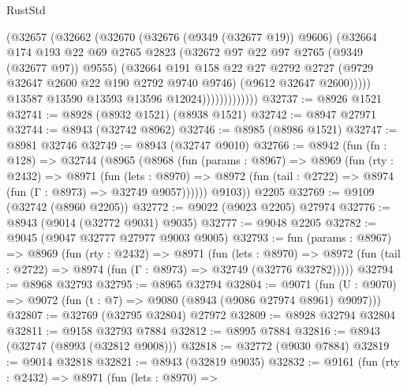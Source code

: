 \begin{lexlean}{RustStd}
\begin{coremodule}
                            (@32657
                              (@32662
                                (@32670
                                  (@32676 (@9349 (@32677 @19)) @9606)
                                  (@32664
                                    @174
                                    @193
                                    @22
                                    @69
                                    @2765
                                    @2823
                                    (@32672 @97 @22 @97 @2765 (@9349 (@32677 @97)) @9555)
                                    (@32664
                                      @191
                                      @158
                                      @22
                                      @27
                                      @2792
                                      @2727
                                      (@9729 @32647 @2600 @22 @190 @2792 @9740 @9746)
                                      (@9612 @32647 @2600)))))
                              @13587
                              @13590
                              @13593
                              @13596
                              @12024)))))))))))))
@32737 := @8926 @1521
@32741 := @8928 (@8932 @1521) (@8938 @1521)
@32742 := @8947 @27971
@32744 := @8943 (@32742 @8962)
@32746 := @8985 (@8986 @1521)
@32747 := @8981 @32746
@32749 := @8943 (@32747 @9010)
@32766 := @8942
    (fun (fn : @128) =>
    @32744
      (@8965
        (@8968
          (fun (params : @8967) =>
          @8969
            (fun (rty : @2432) =>
            @8971
              (fun (lets : @8970) =>
              @8972 (fun (tail : @2722) => @8974 (fun (Γ : @8973) => @32749 @9057))))))
        @9103))
    @2205
@32769 := @9109 (@32742 (@8960 @2205))
@32772 := @9022 (@9023 @2205) @27974
@32776 := @8943 (@9014 (@32772 @9031) @9035)
@32777 := @9048 @2205
@32782 := @9045 (@9047 @32777 @27977 @9003 @9005)
@32793 := fun (params : @8967) =>
  @8969
    (fun (rty : @2432) =>
    @8971
      (fun (lets : @8970) =>
      @8972 (fun (tail : @2722) => @8974 (fun (Γ : @8973) => @32749 (@32776 @32782)))))
@32794 := @8968 @32793
@32795 := @8965 @32794
@32804 := @9071
    (fun (U : @9070) => @9072 (fun (t : @7) => @9080 (@8943 (@9086 @27974 @8961) @9097)))
@32807 := @32769 (@32795 @32804) @27972
@32809 := @8928 @32794 @32804
@32811 := @9158 @32793 @7884
@32812 := @8995 @7884
@32816 := @8943 (@32747 (@8993 (@32812 @9008)))
@32818 := @32772 (@9030 @7884)
@32819 := @9014 @32818
@32821 := @8943 (@32819 @9035)
@32832 := @9161
    (fun (rty : @2432) =>
    @8971
      (fun (lets : @8970) =>

\end{coremodule}
\end{lexlean}
